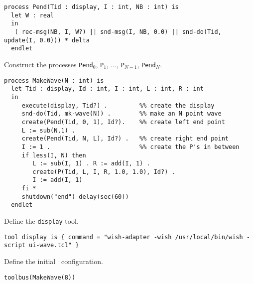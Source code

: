 \small
\begin{verbatim}
process Pend(Tid : display, I : int, NB : int) is
  let W : real
  in
   ( rec-msg(NB, I, W?) || snd-msg(I, NB, 0.0) || snd-do(Tid, update(I, 0.0))) * delta
  endlet

\end{verbatim}
\noindent
\normalsize
 Construct the processes {\tt Pend}$_0$, {\tt P}$_1$, ..., {\tt P}$_{N-1}$, {\tt Pend}$_N$.

\small
\begin{verbatim}
process MakeWave(N : int) is
  let Tid : display, Id : int, I : int, L : int, R : int
  in
     execute(display, Tid?) .         %% create the display
     snd-do(Tid, mk-wave(N)) .        %% make an N point wave
     create(Pend(Tid, 0, 1), Id?).    %% create left end point
     L := sub(N,1) .
     create(Pend(Tid, N, L), Id?) .   %% create right end point
     I := 1 .                         %% create the P's in between
     if less(I, N) then
        L := sub(I, 1) . R := add(I, 1) .
        create(P(Tid, L, I, R, 1.0, 1.0), Id?) .
        I := add(I, 1)
     fi *
     shutdown("end") delay(sec(60))
  endlet

\end{verbatim}
\noindent
\normalsize
 Define the {\tt display} tool.

\small
\begin{verbatim}
tool display is { command = "wish-adapter -wish /usr/local/bin/wish -script ui-wave.tcl" }

\end{verbatim}
\noindent
\normalsize
 Define the initial \TB\ configuration.

\small
\begin{verbatim}
toolbus(MakeWave(8))
\end{verbatim}
\normalsize
